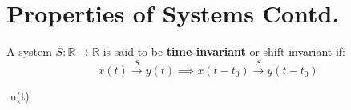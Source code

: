 \chapter{Properties of Systems Contd.}

\begin{definition}
    A system $S : \mathbb{R} \to \mathbb{R}$ is said to be \textbf{time-invariant} or shift-invariant if:
    $$ x (t) \xrightarrow{S} y(t) \implies x(t - t_0) \xrightarrow{S} y(t - t_0) $$
\end{definition}

\begin{example}
    $$ u(t) \rightarrow {}
\end{example}
